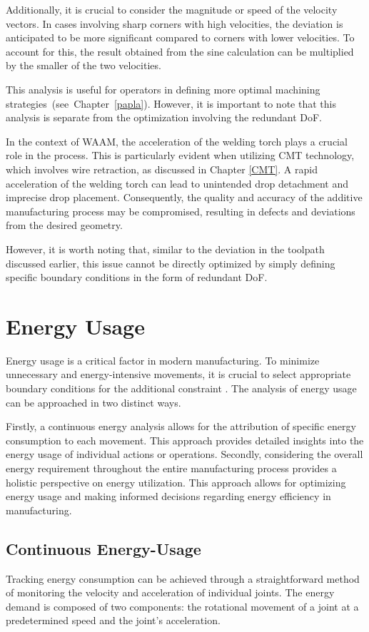 Additionally, it is crucial to consider the magnitude or speed of the velocity vectors. In cases involving sharp corners with high velocities, the deviation is anticipated to be more significant compared to corners with lower velocities. To account for this, the result obtained from the sine calculation can be multiplied by the smaller of the two velocities.

This analysis is useful for operators in defining more optimal machining strategies~(see~Chapter~\ref{papla}). However, it is important to note that this analysis is separate from the optimization involving the redundant DoF.

In the context of WAAM, the acceleration of the welding torch plays a crucial role in the process. This is particularly evident when utilizing CMT technology, which involves wire retraction, as discussed in Chapter \ref{CMT}. A rapid acceleration of the welding torch can lead to unintended drop detachment and imprecise drop placement. Consequently, the quality and accuracy of the additive manufacturing process may be compromised, resulting in defects and deviations from the desired geometry.

However, it is worth noting that, similar to the deviation in the toolpath discussed earlier, this issue cannot be directly optimized by simply defining specific boundary conditions in the form of redundant DoF.

\section{Energy Usage}
Energy usage is a critical factor in modern manufacturing. To minimize unnecessary and energy-intensive movements, it is crucial to select appropriate boundary conditions for the additional constraint . The analysis of energy usage can be approached in two distinct ways.

Firstly, a continuous energy analysis allows for the attribution of specific energy consumption to each movement. This approach provides detailed insights into the energy usage of individual actions or operations. Secondly, considering the overall energy requirement throughout the entire manufacturing process provides a holistic perspective on energy utilization. This approach allows for optimizing energy usage and making informed decisions regarding energy efficiency in manufacturing.

\subsection{Continuous Energy-Usage}
Tracking energy consumption can be achieved through a straightforward method of monitoring the velocity and acceleration of individual joints. The energy demand is composed of two components: the rotational movement of a joint at a predetermined speed and the joint's acceleration.

